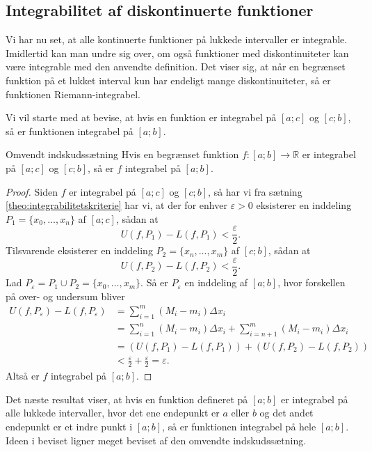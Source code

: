 \subsection{Integrabilitet af diskontinuerte funktioner}%
\label{sub:Integralet af diskontinuerte funktioner}
Vi har nu set, at alle kontinuerte funktioner på lukkede intervaller er integrable.
Imidlertid kan man undre sig over, om også funktioner med diskontinuiteter kan være integrable med den anvendte definition.
Det viser sig, at når en begrænset funktion på et lukket interval kun har endeligt mange diskontinuiteter, så er funktionen Riemann-integrabel. 

Vi vil starte med at bevise, at hvis en funktion er integrabel på $[a;c]$ og $[c;b]$, så er funktionen integrabel på $[a;b]$.

\begin{theorem}[label=theo:omvendt_indskud]{Omvendt indskudssætning}{}
  Hvis en begrænset funktion $f: [a;b] \to \mathbb{R}$ er integrabel på $[a;c]$ og $[c;b]$, så er $f$ integrabel på $[a;b]$. 
\end{theorem}
\begin{proof} 
  Siden $f$ er integrabel på $[a;c]$ og $[c;b]$, så har vi fra sætning \ref{theo:integrabilitetskriterie} har vi, at der for enhver $\varepsilon >0$ eksisterer en inddeling $P_1=\{ x_0, \ldots , x_n \} $ af $[a;c]$, sådan at
  \[
  U(f, P_1)-L(f, P_1)<\frac{\varepsilon }{2}.
  \] 
  Tilsvarende eksisterer en inddeling $P_2 = \{ x_n, \ldots , x_m \} $ af $[c;b]$, sådan at
  \[
  U(f, P_2)-L(f, P_2)<\frac{\varepsilon }{2}.
  \] 
  Lad $P _{\varepsilon }=P_1 \cup P_2=\{ x_0, \ldots , x_m \} $.
  Så er $P _{\varepsilon }$ en inddeling af $[a;b]$, hvor forskellen på over- og undersum bliver
  \begin{equation*}
  \begin{split}
    U(f, P_{\varepsilon })-L(f, P_{\varepsilon })&=\sum_{i  =1}^{m} (M_i - m_i) \Delta x_i \\
    &=\sum_{i =1}^{n} (M_i - m_i) \Delta x_i + \sum_{i =n+1}^{m} (M_i-m_i) \Delta x_i \\
    &=(U(f, P_1)-L(f, P_1)) + (U(f, P_2)-L(f, P_2))\\
    &< \frac{\varepsilon }{2} + \frac{\varepsilon }{2} = \varepsilon.  
  \end{split}
  \end{equation*}
  Altså er $f$ integrabel på $[a;b]$.
\end{proof}

Det næste resultat viser, at hvis en funktion defineret på $[a;b]$ er integrabel på alle lukkede intervaller, hvor det ene endepunkt er $a$ eller $b$ og det andet endepunkt er et indre punkt i $[a;b]$, så er funktionen integrabel på hele $[a;b]$.
Ideen i beviset ligner meget beviset af den omvendte indskudssætning.

